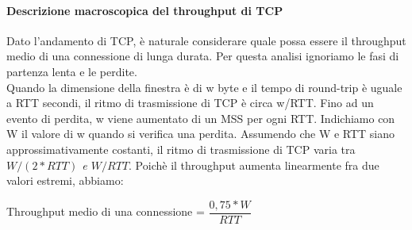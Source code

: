 \documentclass[11pt,a4paper]{article}
\begin{document}
\paragraph{Descrizione macroscopica del throughput di TCP}
Dato l'andamento di TCP, è naturale considerare quale possa essere il throughput medio di una connessione di lunga durata. Per questa analisi ignoriamo le fasi di partenza lenta e le perdite.\\
Quando la dimensione della finestra è di w byte e il tempo di round-trip è uguale a RTT secondi, il ritmo di trasmissione di TCP è circa w/RTT. Fino ad un evento di perdita, w viene aumentato di un MSS per ogni RTT. Indichiamo con W il valore di w quando si verifica una perdita. Assumendo che W e RTT siano approssimativamente costanti, il ritmo di trasmissione di TCP varia tra \emph{$W/(2 * RTT)$ e $W/RTT$}. Poichè il throughput aumenta linearmente fra due valori estremi, abbiamo:
\begin{center}
	Throughput medio di una connessione = $\dfrac{0,75 * W}{RTT}$
\end{center}
\end{document}
